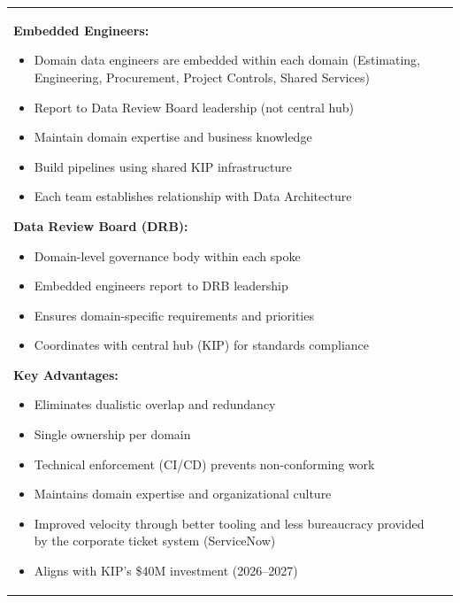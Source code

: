 \documentclass[10pt, a4paper]{article}
\begin{document}
{\begin{tabular}[t]{@{}p{}@{\hspace{0.02\textwidth}}p{}@{}}
\vspace{0.1em}

\textbf{Embedded Engineers:}
\begin{itemize}[leftmargin=1em, itemsep=0.05em]
    \item Domain data engineers are embedded within each domain (Estimating, Engineering, Procurement, Project Controls, Shared Services)
    \item Report to Data Review Board leadership (not central hub)
    \item Maintain domain expertise and business knowledge
    \item Build pipelines using shared KIP infrastructure
    \item Each team establishes relationship with Data Architecture
\end{itemize}

\vspace{0.1em}

\textbf{Data Review Board (DRB):}
\begin{itemize}[leftmargin=1em, itemsep=0.05em]
    \item Domain-level governance body within each spoke
    \item Embedded engineers report to DRB leadership
    \item Ensures domain-specific requirements and priorities
    \item Coordinates with central hub (KIP) for standards compliance
\end{itemize}

\vspace{0.1em}

\textbf{Key Advantages:}
\begin{itemize}[leftmargin=1em, itemsep=0.05em]
    \item Eliminates dualistic overlap and redundancy
    \item Single ownership per domain
    \item Technical enforcement (CI/CD) prevents non-conforming work
    \item Maintains domain expertise and organizational culture
    \item Improved velocity through better tooling and less bureaucracy provided by the corporate ticket system (ServiceNow)
    \item Aligns with KIP's \$40M investment (2026--2027)
\end{itemize}

\end{tabular}
}
\end{document}
